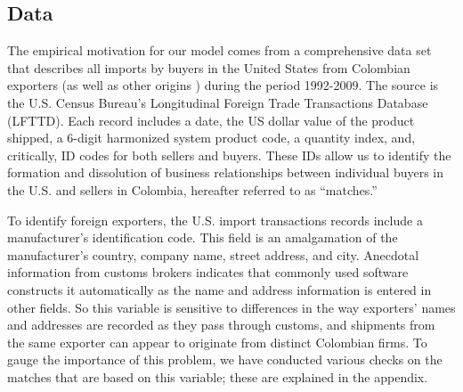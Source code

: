\subsection{Data}

The empirical motivation for our model comes from a comprehensive data set
that describes all imports by buyers in the United States from Colombian
exporters (as well as other origins ) during the period 1992-2009. The
source is the U.S. Census Bureau's Longitudinal Foreign Trade Transactions
Database (LFTTD). Each record includes a date, the US dollar value of the
product shipped, a 6-digit harmonized system product code, a quantity index,
and, critically, ID codes for both sellers and buyers. These IDs allow us to
identify the formation and dissolution of business relationships between
individual buyers in the U.S. and sellers in Colombia, hereafter referred to
as \textquotedblleft matches.\textquotedblright \footnotemark{}\ 

To identify foreign exporters, the U.S. import transactions records include
a manufacturer's identification code.\footnotemark{} This field is an
amalgamation of the manufacturer's country, company name, street address,
and city. Anecdotal information from customs brokers indicates that commonly
used software constructs it automatically as the name and address
information is entered in other fields. So this variable is sensitive to
differences in the way exporters' names and addresses are recorded as they
pass through customs, and shipments from the same exporter can appear to
originate from distinct Colombian firms. To gauge the importance of this
problem, we have conducted various checks on the matches that are based on
this variable; these are explained in the appendix.

